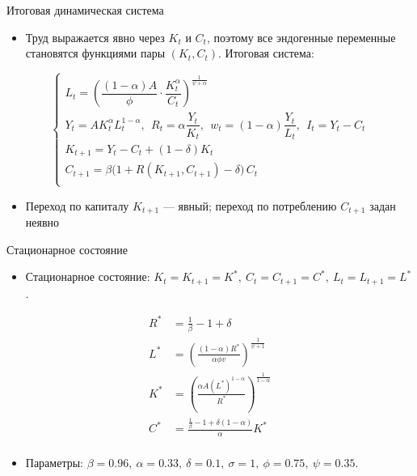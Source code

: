 \documentclass[
aspectratio=169,	%
LEEC,				%
portuguese,			%
]{DEEclassP}
\begin{document}
\begin{frame}{Итоговая динамическая система}
\scriptsize
\begin{itemize}
    \item Труд выражается явно через $K_t$ и $C_t$, поэтому все эндогенные переменные становятся функциями пары $(K_t,C_t)$. Итоговая система:
\end{itemize}
\[
\begin{cases}
L_t = \left( \dfrac{(1-\alpha)A}{\phi}\cdot\dfrac{K_t^{\alpha}}{C_t} \right)^{\frac{1}{\psi+\alpha}} \\[8pt]
Y_t = A K_t^{\alpha} L_t^{1-\alpha},\;\,
R_t = \alpha \dfrac{Y_t}{K_t},\;\,
w_t = (1-\alpha)\dfrac{Y_t}{L_t},\;\,
I_t = Y_t - C_t \\[8pt]
K_{t+1} = Y_t - C_t + (1-\delta) K_t \\[6pt]
C_{t+1} = \beta\big(1 + R(K_{t+1},C_{t+1}) - \delta\big)\,C_t \\
\end{cases}
\]
\begin{itemize}
    \item Переход по капиталу $K_{t+1}$ --- явный; переход по потреблению $C_{t+1}$ задан неявно
\end{itemize}
\end{frame}



\begin{frame}{Стационарное состояние}
\scriptsize


    \begin{itemize}
        \item Стационарное состояние:
        \(K_t=K_{t+1}=K^*,\ C_t=C_{t+1}=C^*,\ L_t=L_{t+1}=L^*\).
    \end{itemize}
    \begin{align*}
        R^* &=\frac{1}{\beta}-1+\delta\\
        L^* &=\left(\frac{(1-\alpha)R^*}{\alpha \phi v}\right)^{\frac{1}{\psi+1}}\\
        K^* &=\left(\frac{\alpha A (L^*)^{1-\alpha}}{R^*}\right)^{\frac{1}{1-\alpha}}\\
        C^* &=\frac{\frac{1}{\beta}-1+\delta(1-\alpha)}{\alpha}K^*\\
    \end{align*}

    \begin{itemize}
        \item Параметры: \(\beta=0.96,\ \alpha=0.33,\ \delta=0.1,\ \sigma=1,\ \phi=0.75,\ \psi=0.35\).
    \end{itemize}
\end{frame}
\end{document}
